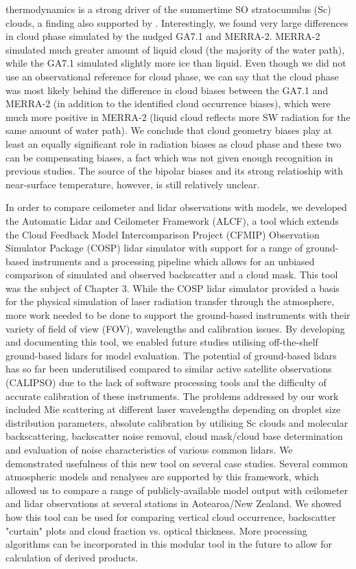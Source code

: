 thermodynamics is a strong driver of the summertime SO stratocumulus (Sc) clouds,
a finding also supported by \cite{hartery2020b}. Interestingly, we found
very large differences in cloud phase simulated by the nudged GA7.1 and MERRA-2.
MERRA-2 simulated much greater amount of liquid cloud (the majority of
the water path), while the GA7.1 simulated slightly more ice than liquid.
Even though we did not use an observational reference for cloud phase,
we can say that the cloud phase was most likely behind the difference in
cloud biases between the GA7.1 and MERRA-2 (in addition to the identified cloud occurrence biases), which were much more positive
in MERRA-2 (liquid cloud reflects more SW radiation for the same amount of water
path). We conclude that cloud geometry biases play at least an equally
significant role in radiation biases as cloud phase and these two can be
compensating biases, a fact which was not given enough recognition in previous
studies. The source of the bipolar biases and its strong relatioship with
near-surface temperature, however, is still relatively unclear.

In order to compare ceilometer and lidar observations with models,
we developed the Automatic Lidar and Ceilometer Framework (ALCF),
a tool which extends the Cloud Feedback Model Intercomparison Project (CFMIP) Observation Simulator Package (COSP) lidar simulator with support for a range
of ground-based instruments and a processing pipeline which allows
for an unbiased comparison of simulated and observed backscatter and a cloud mask.
This tool was the subject of Chapter 3. While the COSP lidar simulator
provided a basis for the physical simulation of laser radiation transfer
through the atmosphere, more work needed to be done to support the ground-based
instruments with their variety of field of view (FOV), wavelengths and
calibration issues. By developing and documenting this tool, we enabled future
studies utilising off-the-shelf ground-based lidars for model evaluation.
The potential of ground-based lidars has so far been underutilised compared
to similar active satellite observations (CALIPSO) due to the
lack of software processing tools and the difficulty of accurate calibration
of these instruments. The problems addressed by our work included Mie
scattering at different laser wavelengths depending on droplet size distribution
parameters, absolute calibration by utilising Sc clouds and molecular
backscattering, backscatter noise removal, cloud mask/cloud base determination 
and evaluation of noise characteristics of various common lidars. We demonstrated
usefulness of this new tool on several case studies. Several common atmospheric
models and renalyses are supported by this framework, which allowed us to compare
a range of publicly-available model output with ceilometer and lidar observations
at several stations in Aotearoa/New Zealand. We showed how this tool can be used
for comparing vertical cloud occurrence, backscatter "curtain" plots
and cloud fraction vs. optical thickness. More processing algorithms can
be incorporated in this modular tool in the future to allow for calculation of
derived products.

